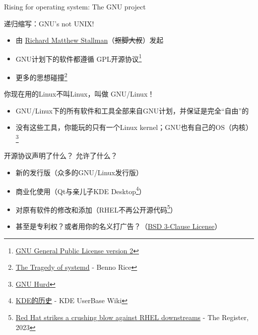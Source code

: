 \documentclass[aspectratio=1610]{beamer}
\begin{document}
\begin{frame}[t]{Rising for operating system: The GNU project}
    \newline
    
    递归缩写：GNU's not UNIX!
    \begin{center}
        \begin{itemize}
            \item 由 \href{https://www.stallman.org/}{Richard Matthew Stallman}（\sout{抠脚大叔}）发起
            \item GNU计划下的软件都遵循 \alert{GPL开源协议}\footnote{\href{https://opensource.org/license/gpl-2-0}{GNU General Public License version 2}}
            \item 更多的思想碰撞\footnote{\href{https://www.bilibili.com/video/BV1oo4y1x7Nw}{The Tragedy of systemd} - Benno Rice}
        \end{itemize}
    \end{center}

    你现在用的Linux不叫Linux，叫做 \alert{GNU/Linux}！
    \begin{center}
        \begin{itemize}
            \item GNU/Linux下的所有软件和工具全部来自GNU计划，并保证是完全“自由”的
            \item 没有这些工具，你能玩的只有一个Linux kernel；GNU也有自己的OS（内核）\footnote{\href{https://www.gnu.org/software/hurd/hurd.html}{GNU Hurd}}
        \end{itemize}
    \end{center}
\end{frame}

\begin{frame}{开源协议声明了什么？}
    允许了什么？
    \begin{itemize}
        \item 新的发行版（众多的GNU/Linux发行版）
        \item \alert{商业化使用}（Qt与亲儿子KDE Desktop\footnote{\href{https://userbase.kde.org/History_of_KDE/zh-cn}{KDE的历史} - KDE UserBase Wiki}）
        \item 对原有软件的修改和添加（RHEL不再公开源代码\footnote{\href{https://www.theregister.com/2023/06/23/red_hat_centos_move/}{Red Hat strikes a crushing blow against RHEL downstreams} - The Register, 2023}）
        \item 甚至是专利权？或者用你的名义打广告？（\href{https://opensource.org/license/bsd-3-clause}{BSD 3-Clause License}）
    \end{itemize}
\end{frame}
\end{document}
